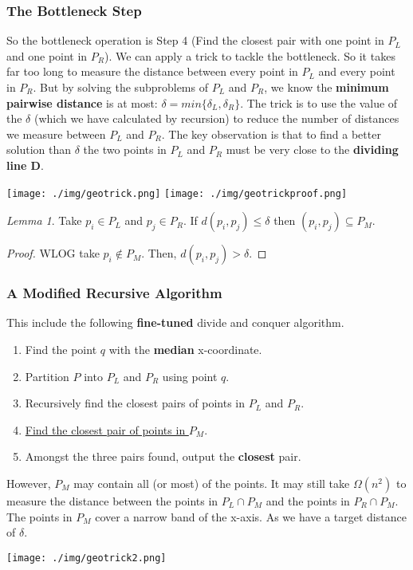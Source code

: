 \documentclass[11pt, a4paper, oneside]{book}
\theoremstyle{theoremdd}
\theoremstyle{remark}
\newtheorem{lemma}{Lemma}[section]
\begin{document}
\subsubsection*{The Bottleneck Step}
So the bottleneck operation is Step 4 (Find the closest pair with one point in $P_{L}$ and one point in $P_{R}$). We can apply a trick to tackle the bottleneck. So it takes far too long to measure the distance between every point in $P_{L}$ and every point in $P_{R}$. But by solving the subproblems of $P_{L}$ and $P_{R}$, we know the \textbf{minimum pairwise distance} is at most: $\delta = min\{\delta_{L},\delta_{R}\}$. The trick is to use the value of the $\delta$ (which we have calculated by recursion) to reduce the number of distances we measure between $P_{L}$ and $P_{R}$. The key observation is that to find a better solution than $\delta$ the two points in $P_{L}$ and $P_{R}$ must be very close to the \textbf{dividing line D}.
\begin{center}
\texttt{[image: ./img/geotrick.png]}
\texttt{[image: ./img/geotrickproof.png]}

\end{center}
\begin{lemma}
Take $p_{i}\in P_{L}$ and $p_{j}\in P_{R}$. If $d(p_{i},p_{j}) \leq \delta$ then $(p_{i},p_{j})\subseteq P_{M}$.
\end{lemma}
\begin{proof}
WLOG take $p_{i} \notin P_{M}$. Then, $d(p_{i},p_{j}) > \delta$.
\end{proof}

\subsubsection{A Modified Recursive Algorithm}
This include the following \textbf{fine-tuned} divide and conquer algorithm. 
\begin{enumerate}
\item Find the point $q$ with the \textbf{median} x-coordinate.
\item Partition $P$ into $P_{L}$ and $P_{R}$ using point $q$.
\item Recursively find the closest pairs of points in $P_{L}$ and $P_{R}$. 
\item \underline{Find the closest pair of points in $P_{M}$}.
\item Amongst the three pairs found, output the \textbf{closest} pair.
\end{enumerate}
However, $P_{M}$ may contain all (or most) of the points. It may still take $\Omega (n^2)$ to measure the distance between the points in $P_{L}\cap P_{M}$ and the points in $P_{R}\cap P_{M}$. The points in $P_{M}$ cover a narrow band of the x-axis. As we have a target distance of $\delta $.
\begin{center}
\texttt{[image: ./img/geotrick2.png]}
\end{center}
\end{document}
